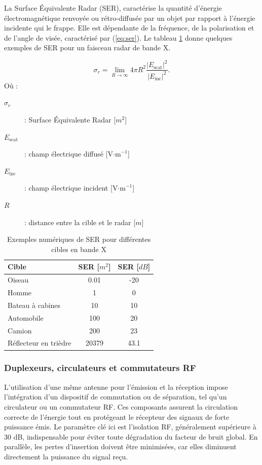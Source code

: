 La Surface Équivalente Radar (SER), caractérise la quantité d’énergie électromagnétique renvoyée ou rétro-diffusée par un objet par rapport à l’énergie incidente qui le frappe. Elle est dépendante de la fréquence, de la polarisation et de l'angle de visée, caractérisé par (\ref{eq:ser}). Le tableau \ref{tab:ser} donne quelques exemples de SER pour un faisceau radar de bande X.

\begin{equation}
\sigma_r = \lim_{R \to \infty} 4 \pi R^2 
\frac{ \left| E_{\text{scat}} \right|^2 }{ \left| E_{\text{inc}} \right|^2 }.
\label{eq:ser}
\end{equation}
Où :
\begin{description}
    \item[$\sigma_r$] : Surface Équivalente Radar [$m^2$]
    \item[$E_{\text{scat}}$] : champ électrique diffusé [$\text{V·m}^{-1}$]
    \item[$E_{\text{inc}}$] : champ électrique incident [$\text{V·m}^{-1}$]
    \item[$R$] : distance entre la cible et le radar [$m$]
\end{description}

\begin{table}[H]
\centering
\begin{tabular}{lcc}
\hline
\textbf{Cible} & \textbf{SER [$m^2$]} & \textbf{SER [$dB$]} \\
\hline
Oiseau & 0.01 & -20 \\
Homme & 1 & 0 \\
Bateau à cabines & 10 & 10 \\
Automobile & 100 & 20 \\
Camion & 200 & 23 \\
Réflecteur en trièdre & 20379 & 43.1 \\
\hline
\end{tabular}
\caption{Exemples numériques de SER pour différentes cibles en bande X}
\label{tab:ser}
\end{table}


\subsubsection{Duplexeurs, circulateurs et commutateurs RF}

L’utilisation d’une même antenne pour l’émission et la réception impose l’intégration d’un dispositif de commutation ou de séparation, tel qu’un circulateur ou un commutateur RF. Ces composants assurent la circulation correcte de l’énergie tout en protégeant le récepteur des signaux de forte puissance émis. Le paramètre clé ici est l’isolation RF, généralement supérieure à 30 dB, indispensable pour éviter toute dégradation du facteur de bruit global. En parallèle, les pertes d’insertion doivent être minimisées, car elles diminuent directement la puissance du signal reçu. 


